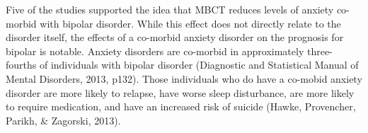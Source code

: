 Five of the studies supported the idea that MBCT reduces levels of anxiety co-morbid with bipolar disorder. While this effect does not directly relate to the disorder itself, the effects of a co-morbid anxiety disorder on the prognosis for bipolar is notable. Anxiety disorders are co-morbid in approximately three-fourths of individuals with bipolar disorder (Diagnostic and Statistical Manual of Mental Disorders, 2013, p132). Those individuals who do have a co-mobid anxiety disorder are more likely to relapse, have worse sleep disturbance, are more likely to require medication, and have an increased risk of suicide (Hawke, Provencher, Parikh, & Zagorski, 2013).